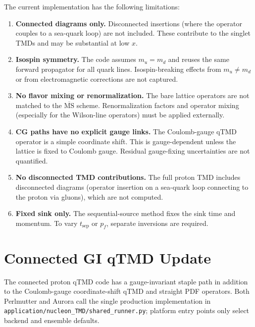 \documentclass[11pt,a4paper]{article}
\begin{document}
The current implementation has the following limitations:

\begin{enumerate}
  \item \textbf{Connected diagrams only.} Disconnected insertions (where the operator
    couples to a sea-quark loop) are not included. These contribute to the singlet
    TMDs and may be substantial at low $x$.
  \item \textbf{Isospin symmetry.} The code assumes $m_u = m_d$ and reuses the same
    forward propagator for all quark lines. Isospin-breaking effects from
    $m_u \neq m_d$ or from electromagnetic corrections are not captured.
  \item \textbf{No flavor mixing or renormalization.} The bare lattice operators are
    not matched to the $\overline{\text{MS}}$ scheme. Renormalization factors and
    operator mixing (especially for the Wilson-line operators) must be applied
    externally.
  \item \textbf{CG paths have no explicit gauge links.} The Coulomb-gauge qTMD
    operator is a simple coordinate shift. This is gauge-dependent unless the
    lattice is fixed to Coulomb gauge. Residual gauge-fixing uncertainties are
    not quantified.
  \item \textbf{No disconnected TMD contributions.} The full proton TMD includes
    disconnected diagrams (operator insertion on a sea-quark loop connecting to
    the proton via gluons), which are not computed.
  \item \textbf{Fixed sink only.} The sequential-source method fixes the sink time
    and momentum. To vary $t_{\text{sep}}$ or $p_f$, separate inversions are required.
\end{enumerate}

\section{Connected GI qTMD Update}
\label{sec:connected_gi_qtmd}

The connected proton qTMD code has a gauge-invariant staple path in addition
to the Coulomb-gauge coordinate-shift qTMD and straight PDF operators.  Both
Perlmutter and Aurora call the single production implementation in
\texttt{application/nucleon\_TMD/shared\_runner.py}; platform entry points only
select backend and ensemble defaults.
\end{document}
